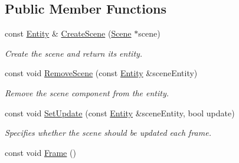 \subsection*{Public Member Functions}
\begin{DoxyCompactItemize}
\item 
const \hyperlink{struct_ensum_1_1_components_1_1_entity}{Entity} \& \hyperlink{class_ensum_1_1_components_1_1_scene_manager_a4a71bb9192da118a71f1b81ca49742cb}{Create\+Scene} (\hyperlink{class_ensum_1_1_components_1_1_scene}{Scene} $\ast$scene)\hypertarget{class_ensum_1_1_components_1_1_scene_manager_a4a71bb9192da118a71f1b81ca49742cb}{}\label{class_ensum_1_1_components_1_1_scene_manager_a4a71bb9192da118a71f1b81ca49742cb}

\begin{DoxyCompactList}\small\item\em Create the scene and return it\textquotesingle{}s entity. \end{DoxyCompactList}\item 
const void \hyperlink{class_ensum_1_1_components_1_1_scene_manager_ab970d3716b08c39b9b8c5484dea11595}{Remove\+Scene} (const \hyperlink{struct_ensum_1_1_components_1_1_entity}{Entity} \&scene\+Entity)\hypertarget{class_ensum_1_1_components_1_1_scene_manager_ab970d3716b08c39b9b8c5484dea11595}{}\label{class_ensum_1_1_components_1_1_scene_manager_ab970d3716b08c39b9b8c5484dea11595}

\begin{DoxyCompactList}\small\item\em Remove the scene component from the entity. \end{DoxyCompactList}\item 
const void \hyperlink{class_ensum_1_1_components_1_1_scene_manager_aea9f13488931b4448778e5563685428e}{Set\+Update} (const \hyperlink{struct_ensum_1_1_components_1_1_entity}{Entity} \&scene\+Entity, bool update)\hypertarget{class_ensum_1_1_components_1_1_scene_manager_aea9f13488931b4448778e5563685428e}{}\label{class_ensum_1_1_components_1_1_scene_manager_aea9f13488931b4448778e5563685428e}

\begin{DoxyCompactList}\small\item\em Specifies whether the scene should be updated each frame. \end{DoxyCompactList}\item 
const void \hyperlink{class_ensum_1_1_components_1_1_scene_manager_ad33a35aa27eeae297a4f16c610205d8a}{Frame} ()\hypertarget{class_ensum_1_1_components_1_1_scene_manager_ad33a35aa27eeae297a4f16c610205d8a}{}\label{class_ensum_1_1_components_1_1_scene_manager_ad33a35aa27eeae297a4f16c610205d8a}


\end{DoxyCompactItemize}
